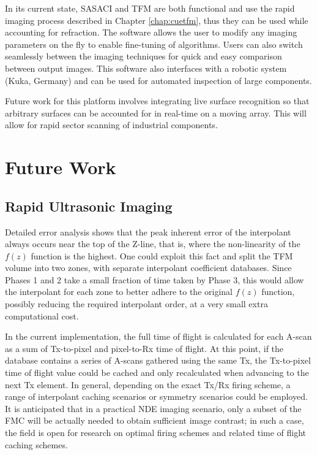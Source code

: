 In its current state, SASACI and TFM are both functional and use the rapid imaging process described in Chapter \ref{chap:cuetfm}, thus they can be used while accounting for refraction. The software allows the user to modify any imaging parameters on the fly to enable fine-tuning of algorithms. Users can also switch seamlessly between the imaging techniques for quick and easy comparison between output images. This software also interfaces with a robotic system (Kuka, Germany) and can be used for automated inspection of large components\cite{brown_automated_2015}.

Future work for this platform involves integrating live surface recognition so that arbitrary surfaces can be accounted for in real-time on a moving array. This will allow for rapid sector scanning of industrial components.

\section{Future Work}\label{sec:future}

\subsection{Rapid Ultrasonic Imaging}\label{sec:future_tfm}
Detailed error analysis shows that the peak inherent error of the interpolant always occurs near the top of the Z-line, that is, where the non-linearity of the $f(z)$ function is the highest. One could exploit this fact and split the TFM volume into two zones, with separate interpolant coefficient databases. Since Phases 1 and 2 take a small fraction of time taken by Phase 3, this would allow the interpolant for each zone to better adhere to the original $f(z)$ function, possibly reducing the required interpolant order, at a very small extra computational cost.

In the current implementation, the full time of flight is calculated for each A-scan as a sum of Tx-to-pixel and pixel-to-Rx time of flight. At this point, if the database contains a series of A-scans gathered using the same Tx, the Tx-to-pixel time of flight value could be cached and only recalculated when advancing to the next Tx element. In general, depending on the exact Tx/Rx firing scheme, a range of interpolant caching scenarios or symmetry scenarios could be employed. It is anticipated that in a practical NDE imaging scenario, only a subset of the FMC will be actually needed to obtain sufficient image contrast; in such a case, the field is open for research on optimal firing schemes and related time of flight caching schemes.


